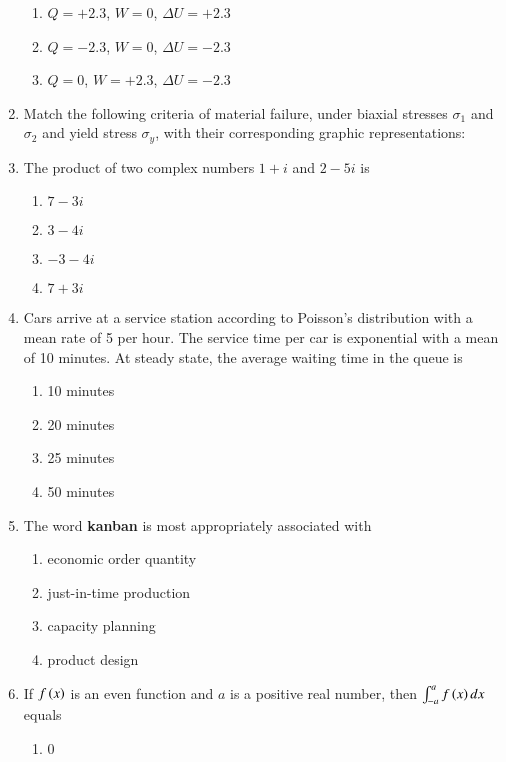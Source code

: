 \documentclass[journal]{IEEEtran}
\begin{document}
\begin{enumerate}
\begin{enumerate}
			\item $Q=+2.3$, $W=0$, $\Delta U = +2.3$
			\item $Q=-2.3$, $W=0$, $\Delta U = -2.3$
			\item $Q=0$, $W=+2.3$, $\Delta U = -2.3$
		\end{enumerate}
	\item
	Match the following criteria of material failure, under biaxial stresses $\sigma_{1}$ and $\sigma_{2}$ and yield stress $\sigma_{y}$, with their corresponding graphic representations:
	\begin{table}[H]    	
    		\centering
    		 
	\end{table}
	
	
	\item
	The product of two complex numbers $1+i$ and $2-5i$ is
		\begin{enumerate}
			\item $7-3i$
			\item $3-4i$
			\item $-3-4i$
			\item $7+3i$
		\end{enumerate}
	\item
	Cars arrive at a service station according to Poisson's distribution with a mean rate of 5 per hour. The service time per car is exponential with a mean of 10 minutes. At steady state, the average waiting time in the queue is
		\begin{enumerate}
			\item 10 minutes
			\item 20 minutes
			\item 25 minutes
			\item 50 minutes
		\end{enumerate}
	\item
	The word \textbf{kanban} is most appropriately associated with
		\begin{enumerate}
			\item economic order quantity
			\item just-in-time production
			\item capacity planning
			\item product design
		\end{enumerate}
	\item
	If $f\left(x\right)$ is an even function and $a$ is a positive real number, then $\int_{-a}^{a} f\left(x\right) dx$ equals
		\begin{enumerate}
			\item 0

\end{enumerate}
\end{enumerate}
\end{document}
